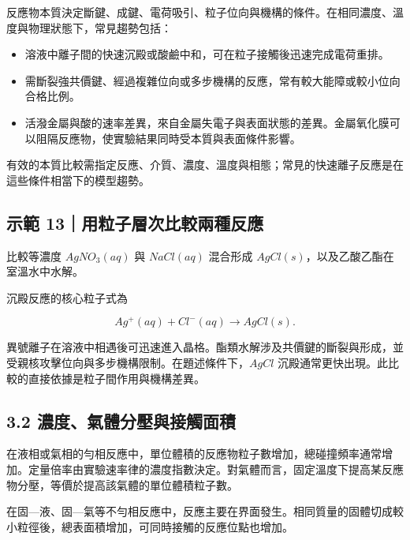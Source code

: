 \documentclass[11pt,a4paper]{article}
\providecommand{\tightlist}{%
  \setlength{\itemsep}{0pt}\setlength{\parskip}{0pt}}
\begin{document}
反應物本質決定斷鍵、成鍵、電荷吸引、粒子位向與機構的條件。在相同濃度、溫度與物理狀態下，常見趨勢包括：

\begin{itemize}
\tightlist
\item
  溶液中離子間的快速沉殿或酸鹼中和，可在粒子接觸後迅速完成電荷重排。
\item
  需斷裂強共價鍵、經過複雜位向或多步機構的反應，常有較大能障或較小位向合格比例。
\item
  活潑金屬與酸的速率差異，來自金屬失電子與表面狀態的差異。金屬氧化膜可以阻隔反應物，使實驗結果同時受本質與表面條件影響。
\end{itemize}

有效的本質比較需指定反應、介質、濃度、溫度與相態；常見的快速離子反應是在這些條件相當下的模型趨勢。

\begin{HandoutWorkedExample}

\subsection{示範 13｜用粒子層次比較兩種反應}\label{ux793aux7bc4-13ux7528ux7c92ux5b50ux5c64ux6b21ux6bd4ux8f03ux5169ux7a2eux53cdux61c9}

比較等濃度 \(AgNO_3(aq)\) 與 \(NaCl(aq)\) 混合形成 \(AgCl(s)\)，以及乙酸乙酯在室溫水中水解。

沉殿反應的核心粒子式為

\[
Ag^+(aq)+Cl^-(aq)\longrightarrow AgCl(s).
\]

異號離子在溶液中相遇後可迅速進入晶格。酯類水解涉及共價鍵的斷裂與形成，並受親核攻擊位向與多步機構限制。在題述條件下，\(AgCl\) 沉殿通常更快出現。此比較的直接依據是粒子間作用與機構差異。

\end{HandoutWorkedExample}

\subsection{3.2 濃度、氣體分壓與接觸面積}\label{ux6fc3ux5ea6ux6c23ux9ad4ux5206ux58d3ux8207ux63a5ux89f8ux9762ux7a4d}

在液相或氣相的勻相反應中，單位體積的反應物粒子數增加，總碰撞頻率通常增加。定量倍率由實驗速率律的濃度指數決定。對氣體而言，固定溫度下提高某反應物分壓，等價於提高該氣體的單位體積粒子數。

在固---液、固---氣等不勻相反應中，反應主要在界面發生。相同質量的固體切成較小粒徑後，總表面積增加，可同時接觸的反應位點也增加。
\end{document}
